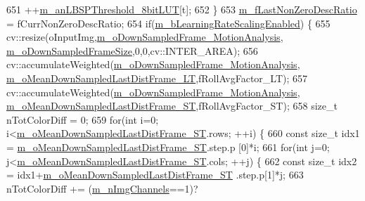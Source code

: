 \begin{DoxyCode}
651                 ++\mbox{\hyperlink{class_background_subtractor_l_b_s_p_aefe69d94f08b2c4ba73ad1d254ad9153}{m\_anLBSPThreshold\_8bitLUT}}[t];
652     \}
653     \mbox{\hyperlink{class_background_subtractor_su_b_s_e_n_s_e_a4231d025a90be64a703f3f0aff1345c8}{m\_fLastNonZeroDescRatio}} = fCurrNonZeroDescRatio;
654     \textcolor{keywordflow}{if}(\mbox{\hyperlink{class_background_subtractor_su_b_s_e_n_s_e_afca07a4c7edca7761e55dfbdf6da4263}{m\_bLearningRateScalingEnabled}}) \{
655         cv::resize(oInputImg,\mbox{\hyperlink{class_background_subtractor_su_b_s_e_n_s_e_a619bc3f0bfcd408796d1ffd6bd45d04d}{m\_oDownSampledFrame\_MotionAnalysis}},
      \mbox{\hyperlink{class_background_subtractor_su_b_s_e_n_s_e_af3e1eb902a5b6b46a1c229864423bd20}{m\_oDownSampledFrameSize}},0,0,cv::INTER\_AREA);
656         cv::accumulateWeighted(\mbox{\hyperlink{class_background_subtractor_su_b_s_e_n_s_e_a619bc3f0bfcd408796d1ffd6bd45d04d}{m\_oDownSampledFrame\_MotionAnalysis}},
      \mbox{\hyperlink{class_background_subtractor_su_b_s_e_n_s_e_ab6056c53d3237ae04da509b36ec40486}{m\_oMeanDownSampledLastDistFrame\_LT}},fRollAvgFactor\_LT);
657         cv::accumulateWeighted(\mbox{\hyperlink{class_background_subtractor_su_b_s_e_n_s_e_a619bc3f0bfcd408796d1ffd6bd45d04d}{m\_oDownSampledFrame\_MotionAnalysis}},
      \mbox{\hyperlink{class_background_subtractor_su_b_s_e_n_s_e_a92a9aec9a8b34383b67d97467bd34515}{m\_oMeanDownSampledLastDistFrame\_ST}},fRollAvgFactor\_ST);
658         \textcolor{keywordtype}{size\_t} nTotColorDiff = 0;
659         \textcolor{keywordflow}{for}(\textcolor{keywordtype}{int} i=0; i<\mbox{\hyperlink{class_background_subtractor_su_b_s_e_n_s_e_a92a9aec9a8b34383b67d97467bd34515}{m\_oMeanDownSampledLastDistFrame\_ST}}.rows; ++i) \{
660             \textcolor{keyword}{const} \textcolor{keywordtype}{size\_t} idx1 = \mbox{\hyperlink{class_background_subtractor_su_b_s_e_n_s_e_a92a9aec9a8b34383b67d97467bd34515}{m\_oMeanDownSampledLastDistFrame\_ST}}.step.p
      [0]*i;
661             \textcolor{keywordflow}{for}(\textcolor{keywordtype}{int} j=0; j<\mbox{\hyperlink{class_background_subtractor_su_b_s_e_n_s_e_a92a9aec9a8b34383b67d97467bd34515}{m\_oMeanDownSampledLastDistFrame\_ST}}.cols; ++j) 
      \{
662                 \textcolor{keyword}{const} \textcolor{keywordtype}{size\_t} idx2 = idx1+\mbox{\hyperlink{class_background_subtractor_su_b_s_e_n_s_e_a92a9aec9a8b34383b67d97467bd34515}{m\_oMeanDownSampledLastDistFrame\_ST}}
      .step.p[1]*j;
663                 nTotColorDiff += (\mbox{\hyperlink{class_background_subtractor_l_b_s_p_ab3467ebee2c5d1249061ccd704cc0584}{m\_nImgChannels}}==1)?

\end{DoxyCode}
